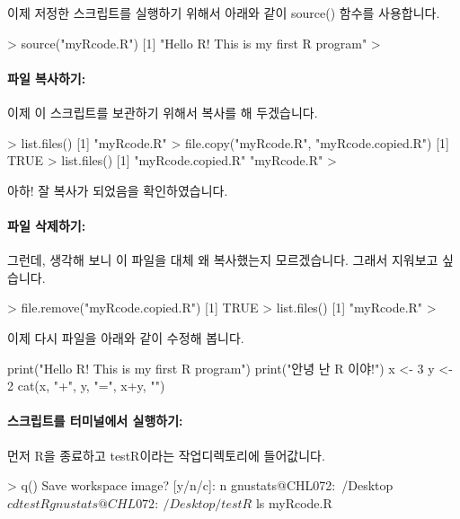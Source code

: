 이제 저정한 스크립트를 실행하기 위해서 아래와 같이 source() 함수를 사용합니다.

\begin{Schunk}
\begin{Soutput}
> source("myRcode.R")
[1] "Hello R!  This is my first R program"
> 
\end{Soutput}
\end{Schunk}

\paragraph{파일 복사하기:}
이제 이 스크립트를 보관하기 위해서 복사를 해 두겠습니다.

\begin{Schunk}
\begin{Soutput}
> list.files()
[1] "myRcode.R"
> file.copy("myRcode.R", "myRcode.copied.R")
[1] TRUE
> list.files()
[1] "myRcode.copied.R" "myRcode.R"       
> 
\end{Soutput}
\end{Schunk}

아하! 잘 복사가 되었음을 확인하였습니다.

\paragraph{파일 삭제하기:}
그런데, 생각해 보니 이 파일을 대체 왜 복사했는지 모르겠습니다. 
그래서 지워보고 싶습니다. 

\begin{Schunk}
\begin{Soutput}
> file.remove("myRcode.copied.R")
[1] TRUE
> list.files()
[1] "myRcode.R"
> 
\end{Soutput}
\end{Schunk}

이제 다시 파일을 아래와 같이 수정해 봅니다. 
\begin{Schunk}
\begin{Soutput}
print("Hello R!  This is my first R program")
print("안녕 난 R 이야!")
x <- 3
y <- 2
cat(x, "+", y, "=", x+y, "\n")
\end{Soutput}
\end{Schunk}

\paragraph{스크립트를 터미널에서 실행하기: }

먼저 R을 종료하고 testR이라는 작업디렉토리에 들어값니다.  
\begin{Schunk}
\begin{Soutput}
> q()
Save workspace image? [y/n/c]: n
gnustats@CHL072:~/Desktop$ cd testR
gnustats@CHL072:~/Desktop/testR$ ls
myRcode.R
\end{Soutput}
\end{Schunk}

